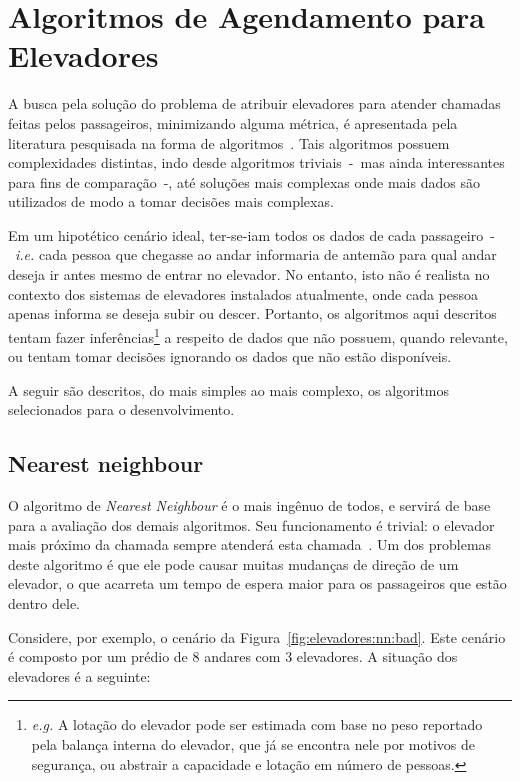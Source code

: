 \chapter{\label{chap:ai}Algoritmos de Agendamento para Elevadores}

A busca pela solução do problema de atribuir elevadores para atender chamadas
feitas pelos passageiros, minimizando alguma métrica, é apresentada pela
literatura pesquisada na forma de algoritmos~\cite{KOEHLEROTTIGER02}.
Tais algoritmos possuem complexidades distintas, indo desde algoritmos
triviais~-~mas ainda interessantes para fins de comparação~-, até soluções mais
complexas onde mais dados são utilizados de modo a tomar decisões mais
complexas.

Em um hipotético cenário ideal, ter-se-iam todos os dados de cada
passageiro~-~\textit{i.e.} cada pessoa que chegasse ao andar informaria de
antemão para qual andar deseja ir antes mesmo de entrar no elevador. No entanto,
isto não é realista no contexto dos sistemas de elevadores instalados
atualmente, onde cada pessoa apenas informa se deseja subir ou descer. Portanto,
os algoritmos aqui descritos tentam fazer inferências\footnote{\textit{e.g.} A
  lotação do elevador pode ser estimada com base no peso reportado pela balança
  interna do elevador, que já se encontra nele por motivos de segurança, ou
  abstrair a capacidade e lotação em número de pessoas.} a respeito de dados que
não possuem, quando relevante, ou tentam tomar decisões ignorando os dados que
não estão disponíveis.

A seguir são descritos, do mais simples ao mais complexo, os algoritmos
selecionados para o desenvolvimento.

\section{\label{sec:ai:nn}Nearest neighbour}

O algoritmo de \textit{Nearest Neighbour} é o mais ingênuo de todos, e servirá
de base para a avaliação dos demais algoritmos. Seu funcionamento é trivial: o
elevador mais próximo da chamada sempre atenderá esta
chamada~\cite{Friese20061908}. Um dos problemas deste algoritmo é que ele pode
causar muitas mudanças de direção de um elevador, o que acarreta um tempo de
espera maior para os passageiros que estão dentro dele.

Considere, por exemplo, o cenário da Figura~\ref{fig:elevadores:nn:bad}. Este
cenário é composto por um prédio de 8 andares com 3 elevadores. A situação dos
elevadores é a seguinte:

